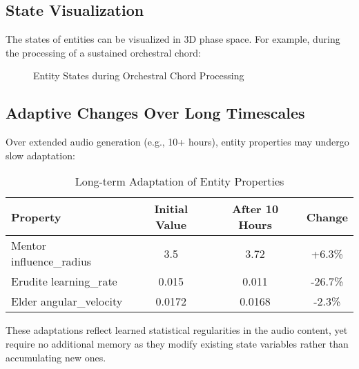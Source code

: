 \subsection{State Visualization}

The states of entities can be visualized in 3D phase space. For example, during the processing of a sustained orchestral chord:

\begin{figure}[h]
\centering
\caption{Entity States during Orchestral Chord Processing}
\end{figure}

\subsection{Adaptive Changes Over Long Timescales}

Over extended audio generation (e.g., 10+ hours), entity properties may undergo slow adaptation:

\begin{table}[h]
\centering
\begin{tabular}{|l|c|c|c|}
\hline
\textbf{Property} & \textbf{Initial Value} & \textbf{After 10 Hours} & \textbf{Change} \\
\hline
Mentor influence\_radius & 3.5 & 3.72 & +6.3\% \\
Erudite learning\_rate & 0.015 & 0.011 & -26.7\% \\
Elder angular\_velocity & 0.0172 & 0.0168 & -2.3\% \\
\hline
\end{tabular}
\caption{Long-term Adaptation of Entity Properties}
\end{table}

These adaptations reflect learned statistical regularities in the audio content, yet require no additional memory as they modify existing state variables rather than accumulating new ones.